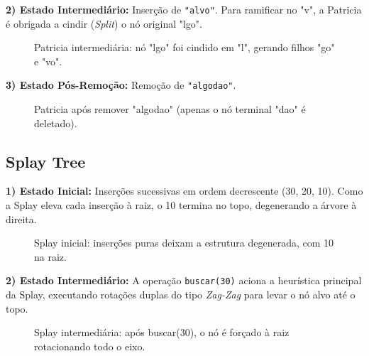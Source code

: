 \documentclass[conference]{IEEEtran}
\begin{document}
\textbf{2) Estado Intermediário:} Inserção de \texttt{"alvo"}. Para ramificar no "v", a Patricia é obrigada a cindir (\textit{Split}) o nó original "lgo".
\begin{figure}[htbp]
\centering
{}
\caption{Patricia intermediária: nó "lgo" foi cindido em "l", gerando filhos "go" e "vo".}
\label{fig:pat2}
\end{figure}

\textbf{3) Estado Pós-Remoção:} Remoção de \texttt{"algodao"}.
\begin{figure}[htbp]
\centering
{}
\caption{Patricia após remover "algodao" (apenas o nó terminal "dao" é deletado).}
\label{fig:pat3}
\end{figure}

\subsection{Splay Tree}

\textbf{1) Estado Inicial:} Inserções sucessivas em ordem decrescente (30, 20, 10). Como a Splay eleva cada inserção à raiz, o 10 termina no topo, degenerando a árvore à direita.
\begin{figure}[htbp]
\centering
{}
\caption{Splay inicial: inserções puras deixam a estrutura degenerada, com 10 na raiz.}
\label{fig:splay1}
\end{figure}

\textbf{2) Estado Intermediário:} A operação \texttt{buscar(30)} aciona a heurística principal da Splay, executando rotações duplas do tipo \textit{Zag-Zag} para levar o nó alvo até o topo.
\begin{figure}[htbp]
\centering
{}
\caption{Splay intermediária: após buscar(30), o nó é forçado à raiz rotacionando todo o eixo.}
\label{fig:splay2}
\end{figure}
\end{document}
